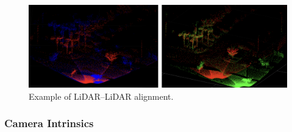 \documentclass{erauthesis}
\begin{document}
\begin{figure}[htbp]
    \centering
    \includegraphics[width=0.9\linewidth]{Images/Lidar2Lidar.png}
    \caption{Example of LiDAR–LiDAR alignment.}
    \label{fig:Lidar2Lidar}
\end{figure}

\subsubsection{Camera Intrinsics} \label{camera_intrinsics}

\end{document}
